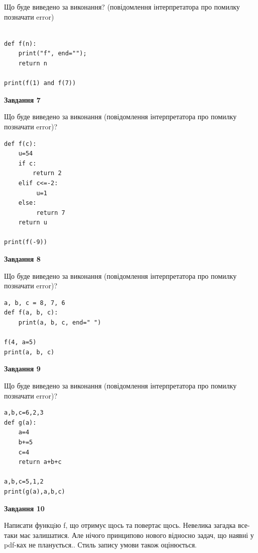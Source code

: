 \documentclass[12pt, ukrainian]{article}
\begin{document}
{\begin {large}
Що буде виведено за виконання? (повідомлення інтерпретатора про помилку позначати error)\par
\begin{verbatim}

def f(n):
    print("f", end="");
    return n

print(f(1) and f(7))
\end{verbatim}

{\begin {center}\textbf{Завдання 7}\end {center}}

Що буде виведено за виконання (повідомлення інтерпретатора про помилку позначати error)?\par
\begin{verbatim}
def f(c):
    u=54
    if c: 
        return 2
    elif c<=-2:
         u=1
    else:
         return 7
    return u

print(f(-9))
\end{verbatim}

{\begin {center}\textbf{Завдання 8}\end {center}}

Що буде виведено за виконання (повідомлення інтерпретатора про помилку позначати error)?\par
\begin{verbatim}
a, b, c = 8, 7, 6
def f(a, b, c):
    print(a, b, c, end=" ")

f(4, a=5)
print(a, b, c)
\end{verbatim}

{\begin {center}\textbf{Завдання 9}\end {center}}

Що буде виведено за виконання (повідомлення інтерпретатора про помилку позначати error)?\par
\begin{verbatim}
a,b,c=6,2,3
def g(a):
    a=4
    b+=5
    c=4
    return a+b+c

a,b,c=5,1,2
print(g(a),a,b,c)
\end{verbatim}

{\begin {center}\textbf{Завдання 10}\end {center}}


Написати функцiю f, що отримує щось та повертає щось. Невелика загадка все-таки має залишатися. Але нічого принципово нового відносно задач, що наявні у pdf-ках не планується.. Стиль запису умови також оцінюється.\par
\end {large}}
\newpage
\end{document}
